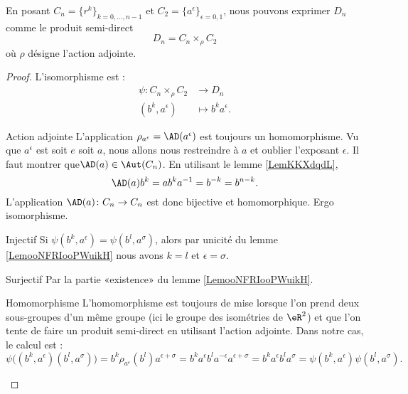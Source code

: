\begin{proposition}
    En posant \( C_n=\{ r^k \}_{k=0,\ldots, n-1}\) et \( C_2=\{ a^{\epsilon} \}_{\epsilon=0,1}\), nous pouvons exprimer \( D_n\) comme le produit semi-direct
    \begin{equation}
        D_n=C_n\times_{\rho}C_2
    \end{equation}
    où \( \rho\) désigne l'action adjointe.
\end{proposition}

\begin{proof}
    L'isomorphisme est :
    \begin{equation}
        \begin{aligned}
            \psi\colon C_n\times_{\rho}C_2&\to D_n \\
            (b^k,a^{\epsilon})&\mapsto b^ka^{\epsilon}.
        \end{aligned}
    \end{equation}
    \begin{subproof}
        \item[Action adjointe]
            L'application \( \rho_{a^{\epsilon}}=\AD(a^{\epsilon})\) est toujours un homomorphisme. Vu que \( a^{\epsilon}\) est soit \( e\) soit \( a\), nous allons nous restreindre à \( a\) et oublier l'exposant \( \epsilon\). Il faut montrer que\( \AD(a)\in\Aut(C_n)\). En utilisant le lemme \ref{LemKKXdqdL},
            \begin{equation}
                \AD(a)b^k=ab^ka^{-1}=b^{-k}=b^{n-k}.
            \end{equation}
            L'application \( \AD(a)\colon C_n\to C_n\) est donc bijective et homomorphique. Ergo isomorphisme.
        \item[Injectif]
            Si \( \psi(b^k,a^{\epsilon})=\psi(b^l,a^{\sigma})\), alors par unicité du lemme \ref{LemooNFRIooPWuikH} nous avons \( k=l\) et \( \epsilon=\sigma\).
        \item[Surjectif]
            Par la partie «existence»  du lemme \ref{LemooNFRIooPWuikH}.
        \item[Homomorphisme]
            L'homomorphisme est toujours de mise lorsque l'on prend deux sous-groupes d'un même groupe (ici le groupe des isométries de \( \eR^2\)) et que l'on tente de faire un produit semi-direct en utilisant l'action adjointe. Dans notre cas, le calcul est : 
            \begin{equation}
                \psi\big( (b^k,a^{\epsilon})(b^l,a^{\sigma}) \big)=b^k\rho_{a^{\epsilon}}(b^l)a^{\epsilon+\sigma}=b^ka^{\epsilon}b^la^{-\epsilon}a^{\epsilon+\sigma}=b^ka^{\epsilon}b^la^{\sigma}=\psi(b^k,a^{\epsilon})\psi(b^l,a^{\sigma}).
            \end{equation}
    \end{subproof}
     
\end{proof}

